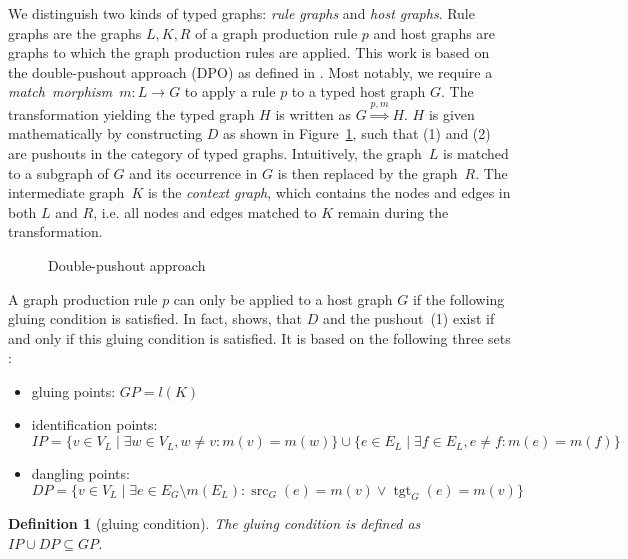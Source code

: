 \documentclass{tlp}
\newtheorem{definition}{Definition}[section]
\DeclareMathOperator{\src}{src}
\DeclareMathOperator{\tgt}{tgt}
\begin{document}
We distinguish two kinds of typed graphs: \emph{rule graphs} and \emph{host
graphs}. Rule graphs are the graphs $L, K, R$ of a graph production rule $p$ and
host graphs are graphs to which the graph production rules are applied. This work
is based on the double-pushout approach (DPO) as defined in
\cite{ehrigprangetaentzer06}. Most notably, we require a \emph{match~morphism}~$m
: L \rightarrow G$ to apply a rule $p$ to a typed host graph $G$. The
transformation yielding the typed graph $H$ is written as $G
\stackrel{p,m}{\Longrightarrow} H$. $H$ is given mathematically by constructing
$D$ as shown in Figure~\ref{fig:dpo}, such that (1) and (2) are pushouts in the
category of typed graphs. Intuitively, the graph~$L$ is matched to a subgraph of
$G$ and its occurrence in $G$ is then replaced by the graph~$R$. The intermediate
graph~$K$ is the \emph{context graph}, which contains the nodes and edges in
both $L$ and $R$, i.e. all nodes and edges matched to $K$ remain during the
transformation.

\begin{figure} 
 \centerline{
 }
  
 \caption{Double-pushout approach}
 \label{fig:dpo}
\end{figure}

A graph production rule $p$ can only be applied to a host graph $G$ if the
following gluing condition is satisfied. In fact, \cite{ehrigprangetaentzer06}
shows, that $D$ and the pushout~(1) exist if and only if this gluing condition is
satisfied. It is based on the following three sets \cite{ehrigprangetaentzer06}:

\begin{itemize}
  \item gluing points: $GP = l(K)$
  \item identification points: $IP = \{ v \in V_L \mid \exists w \in V_L, w \ne 
  v : m(v)=m(w) \} \cup \{ e \in E_L \mid \exists f \in E_L, e \ne f : 
  m(e)=m(f) \}$
  \item dangling points: $DP = \{ v \in V_L \mid \exists e \in E_G \setminus 
  m(E_L) : \src_G(e) = m(v) \vee \tgt_G(e)=m(v) \}$
\end{itemize}

\begin{definition}[gluing condition]
The \emph{gluing condition} is defined as $IP \cup DP \subseteq GP$.
\end{definition}
\end{document}
